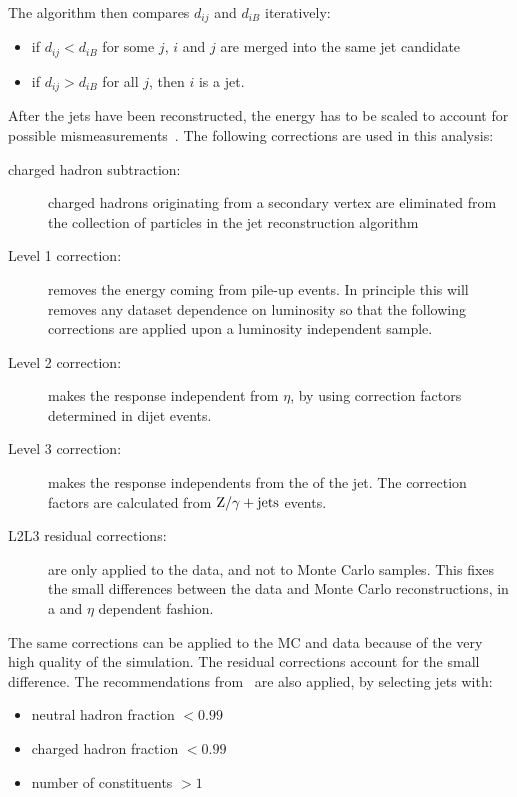 The algorithm then compares $d_{ij}$ and $d_{iB}$ iteratively:
\begin{itemize}
    \item if $d_{ij} < d_{iB}$ for some $j$, $i$ and $j$ are merged into the
        same jet candidate
    \item if $d_{ij} > d_{iB}$ for all $j$, then $i$ is a jet.
\end{itemize}

After the jets have been reconstructed, the energy has to be scaled to
account for possible mismeasurements~\cite{2011JInst...611002C}. The following corrections
are used in this analysis:
\begin{description}
    \item[charged hadron subtraction:] charged hadrons originating from a
        secondary vertex are eliminated from the collection of particles
        in the jet reconstruction algorithm
    \item[Level 1 correction:]removes the energy coming from pile-up
        events. In principle this will removes any dataset dependence on luminosity so that the following corrections are applied upon a luminosity independent sample.
    \item[Level 2 correction:] makes the response independent from
        $\eta$, by using correction factors determined in dijet events.
    \item[Level 3 correction:] makes the response independents from the \pt
        of the jet. The correction factors are calculated from $\mathrm{Z}/\gamma +
        \text{jets}$ events.
    \item[L2L3 residual corrections:] are only applied to the data, and not
        to Monte Carlo samples. This fixes the small differences between the
        data and Monte Carlo reconstructions, in a \pt and $\eta$ dependent
        fashion.
\end{description}
The same corrections can be applied to the MC and data because of the very
high quality of the simulation. The residual corrections account for the
small difference.
The recommendations from~\cite{an:jetid} are also applied, by selecting jets
with:
\begin{itemize}
    \item neutral hadron fraction $< 0.99$
    \item charged hadron fraction $< 0.99$
    \item number of constituents $> 1$
\end{itemize}


